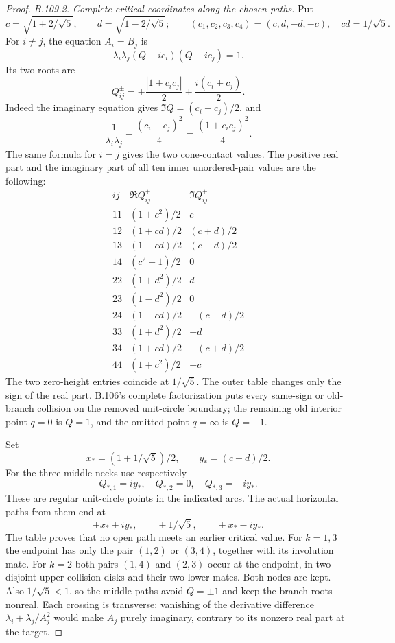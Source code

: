\begin{proof}
\emph{B.109.2. Complete critical coordinates along the chosen paths.}
Put
\[
 c=\sqrt{1+2/\sqrt5},\qquad d=\sqrt{1-2/\sqrt5};
 \qquad(c_1,c_2,c_3,c_4)=(c,d,-d,-c),\quad cd=1/\sqrt5.
\]
For $i\ne j$, the equation $A_i=B_j$ is
\[
 \lambda_i\lambda_j(Q-i c_i)(Q-i c_j)=1.
\]
Its two roots are
\begin{equation}\label{eq:B109-critical}
 Q_{ij}^{\pm}=\pm\frac{|1+c_ic_j|}{2}
                    +\frac{i(c_i+c_j)}2.
\end{equation}
Indeed the imaginary equation gives $\Im Q=(c_i+c_j)/2$, and
\[
 \frac1{\lambda_i\lambda_j}-\frac{(c_i-c_j)^2}{4}
       =\frac{(1+c_ic_j)^2}{4}.
\]
The same formula for $i=j$ gives the two cone-contact values.
The positive real part and the imaginary part of all ten inner
unordered-pair values are the following:
\[
\begin{array}{c|c|c}
 ij&\Re Q_{ij}^{+}&\Im Q_{ij}^{+}\\\hline
 11&(1+c^2)/2&c\\
 12&(1+cd)/2&(c+d)/2\\
 13&(1-cd)/2&(c-d)/2\\
 14&(c^2-1)/2&0\\
 22&(1+d^2)/2&d\\
 23&(1-d^2)/2&0\\
 24&(1-cd)/2&-(c-d)/2\\
 33&(1+d^2)/2&-d\\
 34&(1+cd)/2&-(c+d)/2\\
 44&(1+c^2)/2&-c
\end{array}
\]
The two zero-height entries coincide at $1/\sqrt5$. The outer
table changes only the sign of the real part. B.106's complete
factorization puts every same-sign or old-branch collision on
the removed unit-circle boundary; the remaining old interior
point $q=0$ is $Q=1$, and the omitted point $q=\infty$ is $Q=-1$.

Set
\[
 x_*=(1+1/\sqrt5)/2,\qquad y_*=(c+d)/2.
\]
For the three middle necks use respectively
\[
 Q_{*,1}=iy_*,\quad Q_{*,2}=0,\quad Q_{*,3}=-iy_*.
\]
These are regular unit-circle points in the indicated arcs.
The actual horizontal paths from them end at
\[
 \pm x_*+iy_*,\qquad \pm1/\sqrt5,\qquad \pm x_*-iy_*.
\]
The table proves that no open path meets an earlier critical
value. For $k=1,3$ the endpoint has only the pair $(1,2)$ or
$(3,4)$, together with its involution mate. For $k=2$ both pairs
$(1,4)$ and $(2,3)$ occur at the endpoint, in two disjoint upper
collision disks and their two lower mates. Both nodes are kept.
Also $1/\sqrt5<1$, so the middle paths avoid $Q=\pm1$ and keep
the branch roots nonreal. Each crossing is transverse: vanishing
of the derivative difference
$\lambda_i+\lambda_j/A_j^2$ would make $A_j$ purely imaginary,
contrary to its nonzero real part at the target.


\end{proof}
